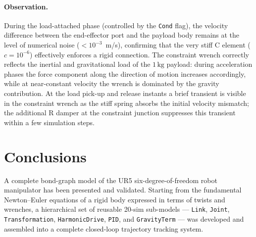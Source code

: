 \paragraph{Observation.}
During the load-attached phase (controlled by the \texttt{Cond} flag), the velocity difference between the end-effector port and the payload body remains at the level of numerical noise ($<10^{-3}$~m/s), confirming that the very stiff C element ($c = 10^{-6}$) effectively enforces a rigid connection.
The constraint wrench correctly reflects the inertial and gravitational load of the $1\,\text{kg}$ payload: during acceleration phases the force component along the direction of motion increases accordingly, while at near-constant velocity the wrench is dominated by the gravity contribution.
At the load pick-up and release instants a brief transient is visible in the constraint wrench as the stiff spring absorbs the initial velocity mismatch; the additional R damper at the constraint junction suppresses this transient within a few simulation steps.


\section{Conclusions}

A complete bond-graph model of the UR5 six-degree-of-freedom robot manipulator has been presented and validated.
Starting from the fundamental Newton--Euler equations of a rigid body expressed in terms of twists and wrenches, a hierarchical set of reusable 20-sim sub-models --- \texttt{Link}, \texttt{Joint}, \texttt{Transformation}, \texttt{HarmonicDrive}, \texttt{PID}, and \texttt{GravityTerm} --- was developed and assembled into a complete closed-loop trajectory tracking system.

